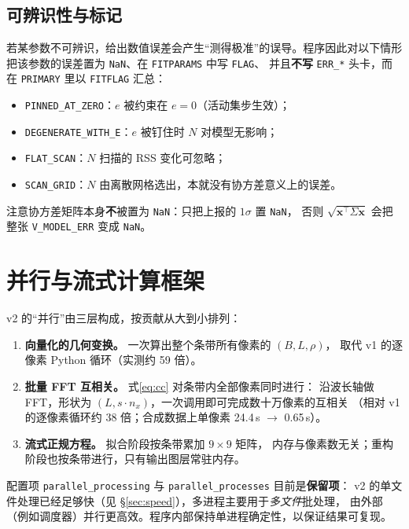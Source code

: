 \documentclass[11pt,a4paper]{ctexart}
\newcommand{\code}[1]{\texttt{\small #1}}
\begin{document}
\subsection{可辨识性与标记}
\label{sec:ident}
若某参数不可辨识，给出数值误差会产生“测得极准”的误导。程序因此对以下情形
把该参数的误差置为 \code{NaN}、在 \code{FITPARAMS} 中写 \code{FLAG}、
并且\textbf{不写} \code{ERR\_*} 头卡，而在 \code{PRIMARY} 里以 \code{FITFLAG} 汇总：
\begin{itemize}
  \item \code{PINNED\_AT\_ZERO}：$e$ 被约束在 $e=0$（活动集步生效）；
  \item \code{DEGENERATE\_WITH\_E}：$e$ 被钉住时 $N$ 对模型无影响；
  \item \code{FLAT\_SCAN}：$N$ 扫描的 RSS 变化可忽略；
  \item \code{SCAN\_GRID}：$N$ 由离散网格选出，本就没有协方差意义上的误差。
\end{itemize}
注意协方差矩阵本身\textbf{不}被置为 \code{NaN}：只把上报的 $1\sigma$ 置 \code{NaN}，
否则 $\sqrt{\bm{x}^\top\Sigma\bm{x}}$ 会把整张 \code{V\_MODEL\_ERR} 变成 \code{NaN}。

\section{并行与流式计算框架}

v2 的“并行”由三层构成，按贡献从大到小排列：

\begin{enumerate}
  \item \textbf{向量化的几何变换。} 一次算出整个条带所有像素的 $(B,L,\rho)$，
        取代 v1 的逐像素 Python 循环（实测约 59 倍）。
  \item \textbf{批量 FFT 互相关。} 式\eqref{eq:cc} 对条带内全部像素同时进行：
        沿波长轴做 FFT，形状为 $(L, s\cdot n_x)$，一次调用即可完成数十万像素的互相关
        （相对 v1 的逐像素循环约 38 倍；合成数据上单像素 24.4\,\textmu s $\to$ 0.65\,\textmu s）。
  \item \textbf{流式正规方程。} 拟合阶段按条带累加 $9\times9$ 矩阵，
        内存与像素数无关；重构阶段也按条带进行，只有输出图层常驻内存。
\end{enumerate}

\noindent
配置项 \code{parallel\_processing} 与 \code{parallel\_processes} 目前是\textbf{保留项}：
v2 的单文件处理已经足够快（见 \S\ref{sec:speed}），多进程主要用于\emph{多文件}批处理，
由外部（例如调度器）并行更高效。程序内部保持单进程确定性，以保证结果可复现。
\end{document}
